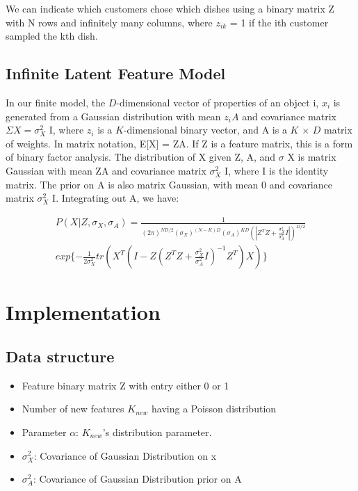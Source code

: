 \documentclass{article}
\begin{document}
We can indicate which customers chose which dishes using a binary matrix Z with N rows and infinitely many columns, where $z_{ik}$ = 1 if the ith customer sampled the kth dish. 

\subsection{Infinite Latent Feature Model}

In our finite model, the $D$-dimensional vector of properties of an object i, $x_i$ is generated from a Gaussian distribution with mean $z_iA$ and covariance matrix $\Sigma X = \sigma^2_X $ I, where $z_i$ is a $K$-dimensional binary vector, and A is a $K$ $\times$ $D$ matrix of weights. In matrix notation, E[X] = ZA. If Z is a feature matrix, this is a form of binary factor analysis. The distribution of X given Z, A, and $\sigma$ X is matrix Gaussian with mean ZA and covariance matrix $\sigma^2_X$ I, where I is the identity matrix. The prior on A is also matrix Gaussian, with mean 0 and covariance matrix $\sigma^2_X$ I. Integrating out A, we have:

\begin{multline}
P(X|Z,\sigma_X, \sigma_A) = \frac{1}{(2 \pi)^{ND/2} (\sigma_X)^{(N-K)D}(\sigma_A)^{KD}(|Z^TZ+\frac{\sigma_X^2}{\sigma_A^2}I|)^{D/2}}\\exp\{-\frac{1}{2\sigma_X^2}tr(X^T(I-Z(Z^TZ+\frac{\sigma_X^2}{\sigma_A^2}I)^{-1}Z^T)X)\}
\end{multline}



\section{Implementation}
\subsection{Data structure}

\begin{itemize}
\item Feature binary matrix Z with entry either 0 or 1
\item Number of new features $K_{new}$ having a Poisson distribution
\item Parameter $\alpha$: $K_{new}$'s distribution parameter.
\item $\sigma^2_X$: Covariance of Gaussian Distribution on x
\item $\sigma^2_A$: Covariance of Gaussian Distribution prior on A

\end{itemize}
\end{document}
